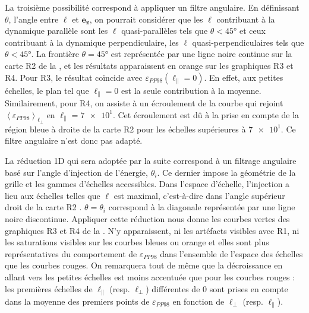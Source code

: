 La troisième possibilité correspond à appliquer un filtre angulaire. En définissant $\theta$, l'angle entre $\boldsymbol{\ell}$ et $\boldsymbol{e_z}$, on pourrait considérer que les $\boldsymbol{\ell}$ contribuant à la dynamique parallèle sont les $\boldsymbol{\ell}$ quasi-parallèles tels que $\theta < \ang{45}$ et ceux contribuant à la dynamique perpendiculaire, les $\boldsymbol{\ell}$ quasi-perpendiculaires tels que $\theta < \ang{45}$. La frontière $\theta = \ang{45}$ est représentée par une ligne noire continue sur la carte R2 de la , et les résultats apparaissent en orange sur les graphiques R3 et R4. Pour R3, le résultat coïncide avec $\varepsilon_{PP98} (\ell_{\parallel} = 0)$. En effet, aux petites échelles, le plan tel que $\ell_{\parallel} = 0$ est la seule contribution à la moyenne. Similairement, pour R4, on assiste à un écroulement de la courbe qui rejoint $\left< \varepsilon_{PP98} \right>_{\ell_{\perp}}$ en $\ell_{\parallel} = \num{7e1}$. Cet écroulement est dû à la prise en compte de la région bleue à droite de la carte R2 pour les échelles supérieures à $\num{7e1}$. Ce filtre angulaire n'est donc pas adapté.

La réduction \acs{1D} qui sera adoptée par la suite correspond à un filtrage angulaire basé sur l'angle d'injection de l'énergie, $\theta_i$. Ce dernier impose la géométrie de la grille et les gammes d'échelles accessibles. Dans l'espace d'échelle, l'injection a lieu aux échelles telles que $\ell$ est maximal, c'est-à-dire dans l'angle supérieur droit de la carte R2 . $\theta = \theta_i$ correspond à la diagonale représentée par une ligne noire discontinue. Appliquer cette réduction nous donne les courbes vertes des graphiques R3 et R4 de la . N'y apparaissent, ni les artéfacts visibles avec R1, ni les saturations visibles sur les courbes bleues ou orange et elles sont plus représentatives du comportement de $\varepsilon_{PP98}$ dans l'ensemble de l'espace des échelles que les courbes rouges. On remarquera tout de même que la décroissance en allant vers les petites échelles est moins accentuée que pour les courbes rouges : les premières échelles de $\ell_{\parallel}$ (resp. $\ell_{\perp}$) différentes de $\num{0}$ sont prises en compte dans la moyenne des premiers points de $\varepsilon_{PP98}$ en fonction de $\ell_{\perp}$ (resp. $\ell_{\parallel}$).

\newpage
